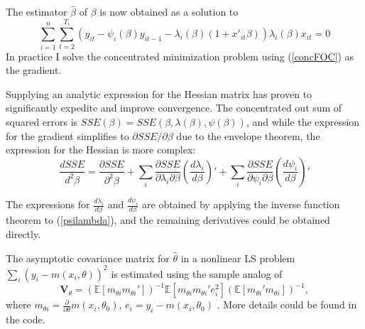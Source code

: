 \documentclass[12pt,pagebackref]{article}
\begin{document}
\noindent The estimator \(\hat \beta\) of \(\beta\) is now obtained as a
solution to \begin{equation}\label{concFOC}
\sum_{i=1}^n \sum_{t=2}^{T_i} (y_{it} - \psi_i(\beta) y_{it-1} - \lambda_i(\beta)(1+x'_{it}\beta))\lambda_i(\beta)x_{it} = 0
\end{equation} In practice I solve the concentrated minimization problem
using (\ref{concFOC}) as the gradient.

Supplying an analytic expression for the Hessian matrix has proven to
significantly expedite and improve convergence. The concentrated out sum
of squared errors is
\(SSE(\beta) = SSE(\beta, \lambda(\beta), \psi(\beta))\), and while the
expression for the gradient simplifies to
\(\partial SSE/\partial \beta\) due to the envelope theorem, the
expression for the Hessian is more complex:
\begin{equation}\label{hessianEq}
\frac{d SSE}{d^2\beta} = \frac{\partial SSE}{\partial^2 \beta} + 
\sum_i \frac{\partial SSE}{\partial\lambda_i \partial \beta} \left(\frac{d \lambda_i}{d \beta}\right)' + 
\sum_i \frac{\partial SSE}{\partial\psi_i \partial \beta} \left(\frac{d \psi_i}{d \beta}\right)'
\end{equation}

\noindent The expressions for \(\frac{d \lambda_i}{d \beta}\) and
\(\frac{d \psi_i}{d \beta}\) are obtained by applying the inverse
function theorem to (\ref{psilambda}), and the remaining derivatives
could be obtained directly.

The asymptotic covariance matrix for \(\hat \theta\) in a nonlinear LS
problem \(\sum_i (y_i - m(x_i, \theta))^2\) is estimated using the
sample analog of \begin{equation}
\mathbf V_\theta = \left(\mathbb{E}\left[m_{\theta i}m_{\theta i}'\right]\right)^{-1}
                \mathbb{E}\left[m_{\theta i}m_{\theta i}'e_i^2\right]
                \left(\mathbb{E}\left[m_{\theta i}'m_{\theta i}\right]\right)^{-1},
\end{equation} where
\(m_{\theta i} = \frac{\partial}{\partial \theta} m(x_i, \theta_0)\),
\(e_i = y_i - m(x_i, \theta_0)\) \citep[p.751]{Hansen20}. More details
could be found in the code.

\newpage


\end{document}
